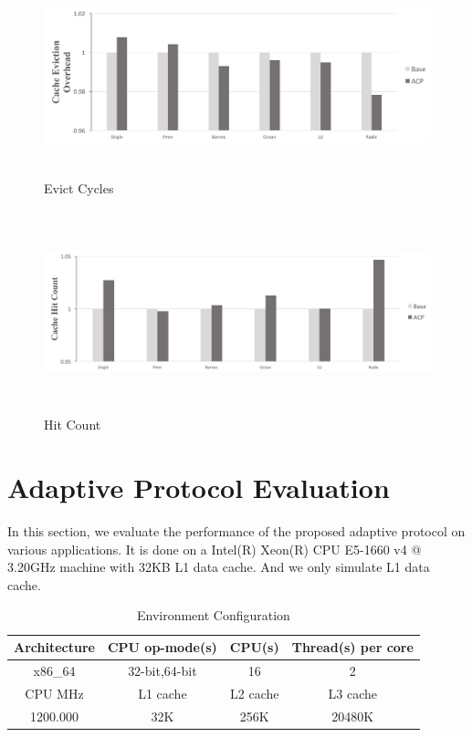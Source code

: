 \documentclass[conference]{IEEEtran}
\begin{document}
\begin{figure}[!h]
\centering
\captionsetup{justification=centering}
\includegraphics[width=7.5in,height=2.3in]{evict_cycles.png}
\caption{Evict Cycles}
\label{evict_cycles}
\end{figure}
\FloatBarrier

\begin{figure}[!h]
\centering
\captionsetup{justification=centering}
\includegraphics[width=7.5in,height=2.3in]{hit_count.png}
\caption{Hit Count}
\label{hit_count}
\end{figure}
\FloatBarrier


\newpage
\null\newpage

\section{Adaptive Protocol Evaluation}
In this section, we evaluate the performance of the proposed adaptive protocol on various applications. It is done on a Intel(R) Xeon(R) CPU E5-1660 v4 @ 3.20GHz machine with 32KB L1 data cache. And we only simulate L1 data cache.

\begin{table}[!h]
\renewcommand{\arraystretch}{2.5}
\caption{Environment  Configuration}
\label{envir_config}
\centering
\begin{tabular}{|c|c|c|c|}
\hline
Architecture & CPU op-mode(s) & CPU(s) & Thread(s) per core \\
\hline
x86\_64 & 32-bit,64-bit & 16 & 2 \\
\hline
CPU MHz & L1 cache & L2 cache & L3 cache \\
\hline
1200.000 & 32K & 256K & 20480K \\
\hline
\end{tabular}
\end{table}
\FloatBarrier
\end{document}
